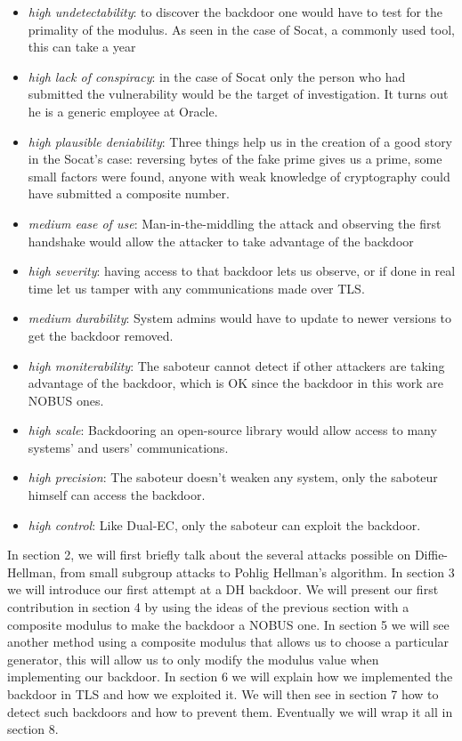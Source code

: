 \documentclass[a4paper,11pt,twocolumn]{article}
\begin{document}
\begin{itemize}
    \item \emph{high undetectability}: to discover the backdoor one would have to test for the primality of the modulus. As seen in the case of Socat, a commonly used tool, this can take a year
    \item \emph{high lack of conspiracy}: in the case of Socat only the person who had submitted the vulnerability would be the target of investigation. It turns out he is a generic employee at Oracle.
    \item \emph{high plausible deniability}: Three things help us in the creation of a good story in the Socat's case: reversing bytes of the fake prime gives us a prime, some small factors were found, anyone with weak knowledge of cryptography could have submitted a composite number.
    \item \emph{medium ease of use}: Man-in-the-middling the attack and observing the first handshake would allow the attacker to take advantage of the backdoor
    \item \emph{high severity}: having access to that backdoor lets us observe, or if done in real time let us tamper with any communications made over TLS.
    \item \emph{medium durability}: System admins would have to update to newer versions to get the backdoor removed.
    \item \emph{high moniterability}: The saboteur cannot detect if other attackers are taking advantage of the backdoor, which is OK since the backdoor in this work are NOBUS ones.
    \item \emph{high scale}: Backdooring an open-source library would allow access to many systems' and users' communications.
    \item \emph{high precision}: The saboteur doesn't weaken any system, only the saboteur himself can access the backdoor.
    \item \emph{high control}: Like Dual-EC, only the saboteur can exploit the backdoor.
\end{itemize}

In section 2, we will first briefly talk about the several attacks possible on Diffie-Hellman, from small subgroup attacks to Pohlig Hellman's algorithm. In section 3 we will introduce our first attempt at a DH backdoor. We will present our first contribution in section 4 by using the ideas of the previous section with a composite modulus to make the backdoor a NOBUS one. In section 5 we will see another method using a composite modulus that allows us to choose a particular generator, this will allow us to only modify the modulus value when implementing our backdoor. In section 6 we will explain how we implemented the backdoor in TLS and how we exploited it. We will then see in section 7 how to detect such backdoors and how to prevent them. Eventually we will wrap it all in section 8.
\end{document}
